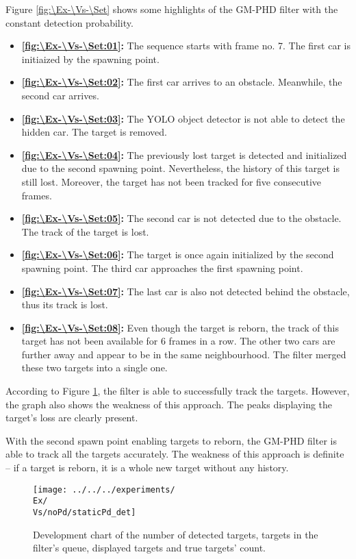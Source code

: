 Figure \ref{fig:\Ex-\Vs-\Set} shows some highlights of the GM-PHD filter with the constant detection probability.
\begin{itemize}
    \item \textbf{\ref{fig:\Ex-\Vs-\Set:01}:} The sequence starts with frame no. 7. The first car is initiaized by
    the spawning point.
    \item \textbf{\ref{fig:\Ex-\Vs-\Set:02}:} The first car arrives to an obstacle. Meanwhile, the second car arrives.
    \item \textbf{\ref{fig:\Ex-\Vs-\Set:03}:} The YOLO object detector is not able to detect the hidden car. The target is removed.
    \item \textbf{\ref{fig:\Ex-\Vs-\Set:04}:} The previously lost target is detected and initialized due to the
    second spawning point. Nevertheless, the history of this target is still lost. Moreover, the target has not been tracked for five consecutive frames.
    \item \textbf{\ref{fig:\Ex-\Vs-\Set:05}:} The second car is not detected due to the obstacle. The track of the target is lost.
    \item \textbf{\ref{fig:\Ex-\Vs-\Set:06}:} The target is once again initialized by the second spawning point. The
    third car approaches the first spawning point.
    \item \textbf{\ref{fig:\Ex-\Vs-\Set:07}:} The last car is also not detected behind the obstacle, thus its track is lost.
    \item \textbf{\ref{fig:\Ex-\Vs-\Set:08}:} Even though the target is reborn, the track of this target has not been
    available for 6 frames in a row. The other two cars are further away and appear to be in the same neighbourhood.
    The filter merged these two targets into a single one.
\end{itemize}

According to Figure \ref{gr:\Ex-\Vs-\Set}, the filter is able to successfully track the targets. However, the graph also
shows the weakness of this approach. The peaks displaying the target's loss are clearly present.

With the second spawn point enabling targets to reborn, the GM-PHD filter is able to track all the targets accurately.
The weakness of this approach is definite -- if a target is reborn, it is a whole new target without any history.

\begin{figure}[H]
    \centering
    \texttt{[image: ../../../experiments/\\Ex/\\Vs/noPd/staticPd\_det]}
    \caption{Development chart of the number of detected targets, targets in the filter's queue, displayed targets and
    true targets' count.}
    \label{gr:\Ex-\Vs-\Set}
\end{figure}

